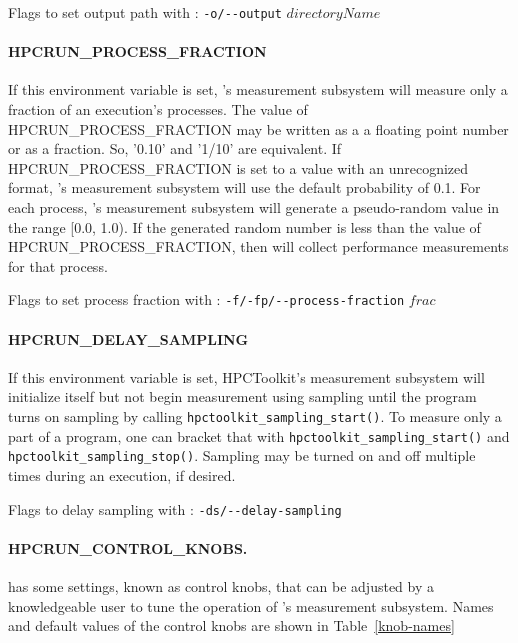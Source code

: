 \parg
Flags to set output path with \hpcrun: \verb|-o/--output| $directoryName$

\paragraph{HPCRUN\_PROCESS\_FRACTION}
\sloppy
If this environment variable is set, \HPCToolkit's measurement
subsystem will measure only a fraction of an execution’s processes.
The value of HPCRUN\_PROCESS\_FRACTION may be written as a a floating
point number or as a fraction.  So, '0.10' and '1/10' are equivalent.
If HPCRUN\_PROCESS\_FRACTION is set to a value with an unrecognized
format, \HPCToolkit's measurement subsystem will use the default
probability of 0.1. For each process, \HPCToolkit's measurement
subsystem will generate a pseudo-random value in the range [0.0, 1.0).
If the generated random number is less than the value of
HPCRUN\_PROCESS\_FRACTION, then \HPCToolkit{} will collect performance
measurements for that process.

\parg
Flags to set process fraction with \hpcrun: \verb|-f/-fp/--process-fraction| $frac$

\paragraph{HPCRUN\_DELAY\_SAMPLING}

\sloppy
If this environment variable is set, HPCToolkit's measurement subsystem
will initialize itself but not begin measurement using sampling
until the program turns on sampling by calling
\verb|hpctoolkit_sampling_start()|. To measure only a part of a
program, one can bracket that with \verb|hpctoolkit_sampling_start()|
and \verb|hpctoolkit_sampling_stop()|. Sampling may be turned on
and off multiple times during an execution, if desired.

\parg
Flags to delay sampling with \hpcrun: \verb|-ds/--delay-sampling|


\paragraph{HPCRUN\_CONTROL\_KNOBS.}

\hpcrun{} has some settings, known as control knobs, that can be adjusted by a knowledgeable user to tune the operation of \hpcrun's measurement subsystem. Names and default values of the control knobs are shown in Table~\ref{knob-names}

